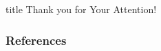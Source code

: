 \documentclass[aspectratio=169,fleqn]{beamer}
\begin{document}
\begin{frame}
  \vfill
  \centering
  \begin{beamercolorbox}[sep=8pt,center,shadow=true,rounded=true]{title}
    Thank you for Your Attention!%
    \par%
  \end{beamercolorbox}
  \vfill
\end{frame}

\begin{frame}
  \frametitle{References}
  \AtNextBibliography{\tiny}
  \begin{multicols}{2}
    \nocite{*}
    \printbibliography
  \end{multicols}
\end{frame}
\end{document}
